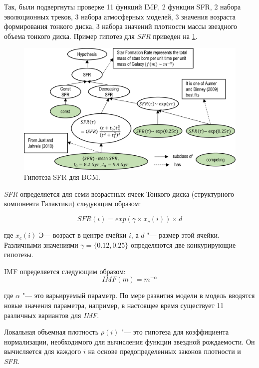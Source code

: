 Так, были подвергнуты проверке 11 функций IMF, 2 функции SFR, 2 набора эволюционных треков, 3 набора атмосферных 
моделей, 3 значения возраста формирования тонкого диска, 3 набора значений плотности массы звездного объема 
тонкого диска. Пример гипотез для \textit{SFR} приведен на \cref{fig:SFR}.

\begin{figure}[ht]
    \centering
    \includegraphics[width=1.0\linewidth]{images/SFR.pdf}
    \caption{Гипотеза SFR для BGM.}\label{fig:SFR}
\end{figure}

\textit{SFR} определяется для семи возрастных ячеек Тонкого диска (структурного компонента Галактики) следующим образом:

\begin{equation}
    SFR(i) = exp(\gamma \times x_c(i)) \times d
\end{equation}

где $x_c(i)$ Э--- возраст в центре ячейки $i$, а $d$ "--- размер этой ячейки. Различными значениями 
$\gamma = \{0.12, 0.25\}$ определяются две конкурирующие гипотезы.

IMF определяется следующим образом:
\begin{equation}
    IMF(m) = m^{-\alpha}
\end{equation}

где $\alpha$ "--- это варьируемый параметр. По мере развития модели в модель вводятся новые значения параметра, 
например, в настоящее время существует 11 различных вариантов для \textit{IMF}.

Локальная объемная плотность $\rho(i)$ "--- это гипотеза для коэффициента нормализации, необходимого для вычисления 
функции звездной рождаемости. Он вычисляется для каждого $i$ на основе предопределенных 
законов плотности и \textit{SFR}.

